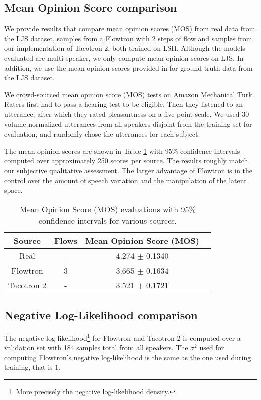 \documentclass{article}
\begin{document}
\label{sec:quantitative_results}
\subsection{Mean Opinion Score comparison}
We provide results that compare mean opinion scores (MOS) from real data from the LJS dataset, samples from a Flowtron with 2 steps of flow and samples from our implementation of Tacotron 2, both trained on LSH. Although the models evaluated are multi-speaker, we only compute mean opinion scores on LJS. In addition, we use the mean opinion scores provided in \cite{prenger2019waveglow} for ground truth data from the LJS dataset.

We crowd-sourced mean opinion score (MOS) tests on Amazon Mechanical Turk. Raters first had to pass a hearing test to be eligible. Then they listened to an utterance, after which they rated pleasantness on a five-point scale. We used 30 volume normalized utterances from all speakers disjoint from the training set for evaluation, and randomly chose the utterances for each subject.

The mean opinion scores are shown in Table \ref{tab:mos_scores} with $95\%$ confidence intervals computed over approximately 250 scores per source. The results roughly match our subjective qualitative assessment. The larger advantage of Flowtron is in the control over the amount of speech variation and the manipulation of the latent space. 

\begin{table}[!ht]
\begin{center}
    \begin{tabular}{c|c|c|c}
        \textbf{Source} & \textbf{Flows} &  \textbf{Mean Opinion Score (MOS)}\\
        \hline
        Real          & -         & 4.274 $\pm$ 0.1340 \\
        Flowtron      & 3         & 3.665 $\pm$ 0.1634 \\
        Tacotron 2    & -         & 3.521 $\pm$ 0.1721 \\
    \end{tabular}
    \caption{Mean Opinion Score (MOS) evaluations with $95\%$ confidence intervals for various sources.}
    \label{tab:mos_scores}
\end{center}
\end{table}

\subsection{Negative Log-Likelihood comparison}
The negative log-likelihood\footnote{More precisely the negative log-likelihood density.} for Flowtron and Tacotron 2 is computed over a validation set with 184 samples total from all speakers. The $\sigma^2$ used for computing Flowtron's negative log-likelihood is the same as the one used during training, that is $1$. 
\end{document}
